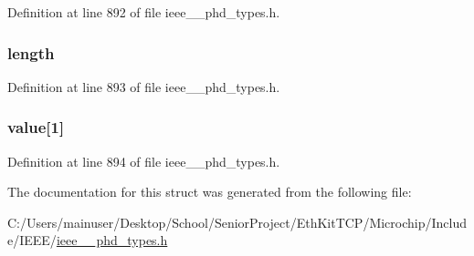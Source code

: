 Definition at line 892 of file ieee\+\_\+\_\+phd\+\_\+types.\+h.

\hypertarget{struct___scan_report_per_var_list_a3743679e4ff85e3e1b3fc2e59973fbb3}{}
\subsubsection[{length}]{ length}\label{struct___scan_report_per_var_list_a3743679e4ff85e3e1b3fc2e59973fbb3}


Definition at line 893 of file ieee\+\_\+\_\+phd\+\_\+types.\+h.

\hypertarget{struct___scan_report_per_var_list_a0e30978c2fa4bb6a8fb5053b65b7a421}{}
\subsubsection[{value}]{ value\mbox{[}1\mbox{]}}\label{struct___scan_report_per_var_list_a0e30978c2fa4bb6a8fb5053b65b7a421}


Definition at line 894 of file ieee\+\_\+\_\+phd\+\_\+types.\+h.



The documentation for this struct was generated from the following file\+:\begin{DoxyCompactItemize}
\item 
C\+:/\+Users/mainuser/\+Desktop/\+School/\+Senior\+Project/\+Eth\+Kit\+T\+C\+P/\+Microchip/\+Include/\+I\+E\+E\+E/\hyperlink{ieee__11073__phd__types_8h}{ieee\+\_\+\_\+phd\+\_\+types.\+h}\end{DoxyCompactItemize}
